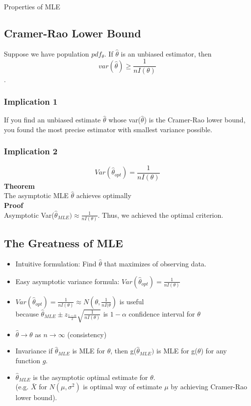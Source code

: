 \documentclass[12pt]{article}
\begin{document}
\begin{section}{Properties of MLE}
\subsection{Cramer-Rao Lower Bound}
Suppose we have population $pdf_\theta$. If $\hat{\theta}$ is an unbiased estimator, then $$var(\hat{\theta}) \geq \frac{1}{nI(\theta)}$$.
\subsubsection{Implication 1} 
If you find an unbiased estimate $\hat{\theta}$ whose var($\hat{\theta}$) is the Cramer-Rao lower bound, you found the most precise estimator with smallest variance possible.

\subsubsection{Implication 2}
$$Var(\hat{\theta}_{opt}) = \frac{1}{nI(\theta)}$$
\textbf{Theorem}\\ 
The asymptotic MLE $\hat{\theta}$ achieves optimally\\
\textbf{Proof} \\
Asymptotic Var($\hat{\theta}_{MLE}) \approx \frac{1}{nI(\theta)}$. Thus, we achieved the optimal criterion.

\subsection{The Greatness of MLE}
\begin{itemize}
	\item Intuitive formulation: Find $\hat{\theta}$ that maximizes of observing data.
    \item Easy asymptotic variance formula: $Var(\hat{\theta}_{opt}) = \frac{1}{nI(\theta)}$
    \item $Var(\hat{\theta}_{opt}) = \frac{1}{nI(\theta)} \approx N(\theta, \frac{1}{nI(\theta})$ is useful \\because $\hat{\theta}_{MLE} \pm z_{\frac{1-\alpha}{2}} \sqrt{\frac{1}{nI(\theta)}}$ is $1-\alpha$ confidence interval for $\theta$
    \item $\hat{\theta} \rightarrow \theta$ as $n\rightarrow\infty$ (consistency)
    \item Invariance if $\hat{\theta}_{MLE}$ is MLE for $\theta$, then g($\hat{\theta}_{MLE})$ is MLE for g($\theta$) for any function $g$.
    \item $\hat{\theta}_{MLE}$ is the asymptotic optimal estimate for $\theta$.\\(e.g. $\bar{X}$ for $N(\mu,\sigma^2)$ is optimal way of estimate $\mu$ by achieving Cramer-Rao lower bound).
\end{itemize}



\end{section}
\end{document}
